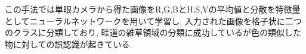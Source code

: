 この手法では単眼カメラから得た画像をR,G,BとH,S,Vの平均値と分散を特徴量としてニューラルネットワークを用いて学習し, 
入力された画像を格子状に二つのクラスに分類しており, 畦道の雑草領域の分類に成功しているが色の類似した物に対しての誤認識が起きている.



%
